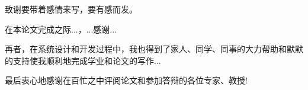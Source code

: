 
\begin{zhixie}
\par
致谢要带着感情来写，要有感而发。
\par
在本论文完成之际...，...感谢...
\par
再者，在系统设计和开发过程中，我也得到了家人、同学、同事的大力帮助和默默的支持使我顺利地完成学业和论文的写作...
\par
最后衷心地感谢在百忙之中评阅论文和参加答辩的各位专家、教授!

\end{zhixie}